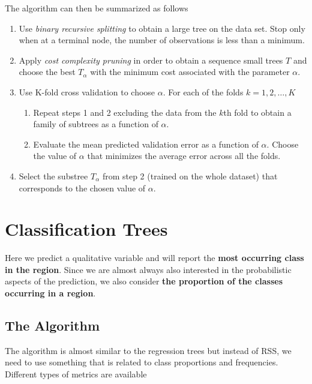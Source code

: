 \documentclass[../statistical_learning_notes.tex]{subfiles}
\begin{document}
    The algorithm can then be summarized as follows
    \begin{enumerate}
        \item Use \emph{binary recursive splitting} to obtain a large tree on the data set. Stop only when at a terminal node, the number of observations is less than a minimum.
        \item Apply \emph{cost complexity pruning} in order to obtain a sequence small trees $T$ and choose the best $T_{\alpha}$ with the minimum cost associated with the parameter $\alpha$.
        \item Use K-fold cross validation to choose $\alpha$. For each of the folds $k = 1, 2, \ldots, K$
        \begin{enumerate}
             \item Repeat steps 1 and 2 excluding the data from the $k$th fold to obtain a family of subtrees as a function of $\alpha$.
             \item Evaluate the mean predicted validation error as a function of $\alpha$.\newline
             Choose the value of $\alpha$ that minimizes the average error across all the folds.
         \end{enumerate}
        \item Select the substree $T_{\alpha}$ from step 2 (trained on the whole dataset) that corresponds to the chosen value of $\alpha$.
    \end{enumerate}
    

    \section{Classification Trees}
    Here we predict a qualitative variable and will report the \textbf{most occurring class in the region}. Since we are almost always also interested in the probabilistic aspects of the prediction, we also consider \textbf{the proportion of the classes occurring in a region}.
    

    \subsection{The Algorithm}
    The algorithm is almost similar to the regression trees but instead of RSS, we need to use something that is related to class proportions and frequencies. Different types of metrics are available
\end{document}
